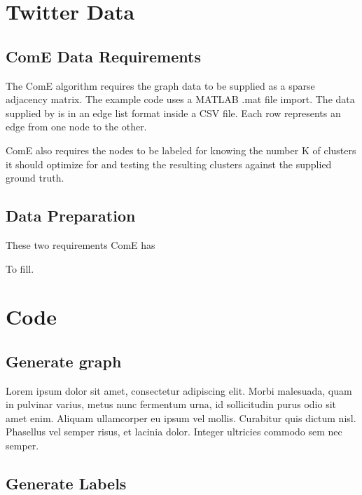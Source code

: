 \documentclass[sigconf]{acmart}
\begin{document}
\section{Twitter Data}

\subsection{ComE Data Requirements}

The ComE algorithm requires the graph data to be supplied as a sparse adjacency matrix. The example code uses a MATLAB .mat file import. The data supplied by \citeauthor{TwitterData} is in an edge list format inside a CSV file. Each row represents an edge from one node to the other.

ComE also requires the nodes to be labeled for knowing the number K of clusters it should optimize for and testing the resulting clusters against the supplied ground truth.

\subsection{Data Preparation}

These two requirements ComE has







\begin{acks}
To fill.
\end{acks}


\appendix

\section{Code}

\subsection{Generate graph}

Lorem ipsum dolor sit amet, consectetur adipiscing elit. Morbi
malesuada, quam in pulvinar varius, metus nunc fermentum urna, id
sollicitudin purus odio sit amet enim. Aliquam ullamcorper eu ipsum
vel mollis. Curabitur quis dictum nisl. Phasellus vel semper risus, et
lacinia dolor. Integer ultricies commodo sem nec semper.

\subsection{Generate Labels}
\end{document}
